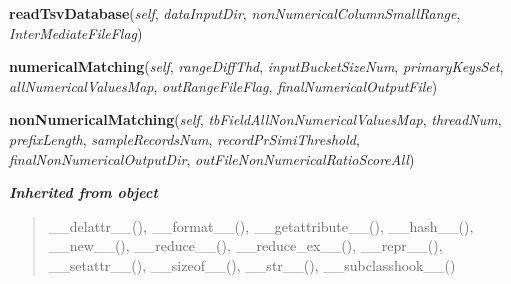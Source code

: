 \hspace{.8\funcindent}\begin{boxedminipage}{\funcwidth}

    \raggedright \textbf{readTsvDatabase}(\textit{self}, \textit{dataInputDir}, \textit{nonNumericalColumnSmallRange}, \textit{InterMediateFileFlag})

\setlength{\parskip}{2ex}
\setlength{\parskip}{1ex}
    \end{boxedminipage}

    \label{mainEntry:dataMatching:numericalMatching}

    \vspace{0.5ex}

\hspace{.8\funcindent}\begin{boxedminipage}{\funcwidth}

    \raggedright \textbf{numericalMatching}(\textit{self}, \textit{rangeDiffThd}, \textit{inputBucketSizeNum}, \textit{primaryKeysSet}, \textit{allNumericalValuesMap}, \textit{outRangeFileFlag}, \textit{finalNumericalOutputFile})

\setlength{\parskip}{2ex}
\setlength{\parskip}{1ex}
    \end{boxedminipage}

    \label{mainEntry:dataMatching:nonNumericalMatching}

    \vspace{0.5ex}

\hspace{.8\funcindent}\begin{boxedminipage}{\funcwidth}

    \raggedright \textbf{nonNumericalMatching}(\textit{self}, \textit{tbFieldAllNonNumericalValuesMap}, \textit{threadNum}, \textit{prefixLength}, \textit{sampleRecordsNum}, \textit{recordPrSimiThreshold}, \textit{finalNonNumericalOutputDir}, \textit{outFileNonNumericalRatioScoreAll})

\setlength{\parskip}{2ex}
\setlength{\parskip}{1ex}
    \end{boxedminipage}


\large{\textbf{\textit{Inherited from object}}}

\begin{quote}
\_\_delattr\_\_(), \_\_format\_\_(), \_\_getattribute\_\_(), \_\_hash\_\_(), \_\_new\_\_(), \_\_reduce\_\_(), \_\_reduce\_ex\_\_(), \_\_repr\_\_(), \_\_setattr\_\_(), \_\_sizeof\_\_(), \_\_str\_\_(), \_\_subclasshook\_\_()
\end{quote}

